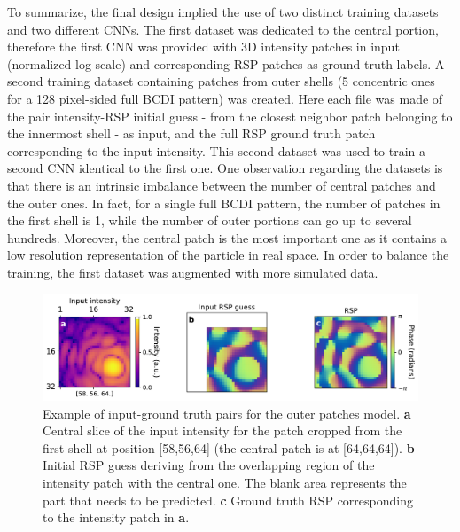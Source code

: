To summarize, the final design implied the use of two distinct training datasets and two different CNNs. 
The first dataset was dedicated to the central portion, therefore the first CNN was provided with 3D intensity patches in 
input (normalized log scale) and corresponding RSP patches as ground truth labels. A second training dataset containing 
patches from outer shells (5 concentric ones for a 128 pixel-sided full BCDI pattern) was created. Here each file was made 
of the pair intensity-RSP initial guess - from the closest neighbor patch belonging to the innermost shell -  as input,
and the full RSP ground truth patch corresponding to the input intensity. This second dataset was used to train a second 
CNN identical to the first one. One observation regarding the datasets is that there is an intrinsic imbalance between the 
number of central patches and the outer ones. In fact, for a single full BCDI pattern, the number of patches in the first shell is 1, 
while the number of outer portions can go up to several hundreds. Moreover, the central patch is the most important one as it 
contains a low resolution representation of the particle in real space. In order to balance the training, the first dataset was 
augmented with more simulated data. 

\begin{figure}[H]
    \centering
    \includegraphics[width=\textwidth]{figures/Phasing/guess_RSP.pdf}
    \caption{Example of input-ground truth pairs for the outer patches model. \textbf{a} Central slice of the input intensity 
    for the patch cropped from the first shell at position [58,56,64] (the central patch is at [64,64,64]). \textbf{b} Initial 
    RSP guess deriving from the overlapping region of the intensity patch with the central one. The blank area represents 
    the part that needs to be predicted. \textbf{c} Ground truth RSP corresponding to the intensity patch in \textbf{a}.}
    
    \label{fig:patches_Xy}

\end{figure}

